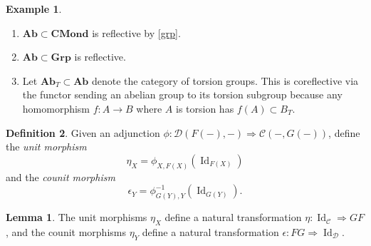 \documentclass[10pt,letterpaper,cm]{nupset}
\theoremstyle{definition}
\newtheorem{definition}{Definition}
\newtheorem{exmp}[definition]{Example}
\theoremstyle{theorem}
\newtheorem{lemma}[theorem]{Lemma}
\theoremstyle{remark}
\newcommand{\1}{\mathbf{1}}
\renewcommand{\c}{\mathscr{C}}
\renewcommand{\d}{\mathscr{D}}
\newcommand{\0}{\vec 0}
\DeclareMathOperator{\id}{Id}
\begin{document}
\begin{exmp} $ $
\begin{enumerate}
\item $\mathbf{Ab}\subset \mathbf{CMond}$ is reflective by \cref{grp}. 
\item $\mathbf{Ab}\subset \mathbf{Grp}$ is reflective. 
\item
Let $\mathbf{Ab}_T\subset \mathbf{Ab}$ denote the category of torsion groups. This is coreflective via the functor sending an abelian group to its torsion subgroup  because any homomorphism $f: A \to B$ where $A$ is torsion has $f(A) \subset B_T$.
\end{enumerate}
\end{exmp}

\begin{definition}
Given an adjunction $\phi: \d(F(-), -) \Rightarrow \c(-, G(-))$, define the \textit{unit morphism} $$\eta_X =\phi_{X, F(X)}(\id_{F(X)})$$ and the \textit{counit morphism} $$\epsilon_Y =\phi_{G(Y), Y}^{{-}1}(\id_{G(Y)}).$$
\end{definition}

\begin{lemma}
The unit morphisms $\eta_X$ define a natural transformation $\eta: \id_{\c} \Rightarrow GF$, and the counit morphisms $\eta_Y$ define a natural transformation $\epsilon: FG \Rightarrow \id_{\d}$.
\end{lemma}
\end{document}
